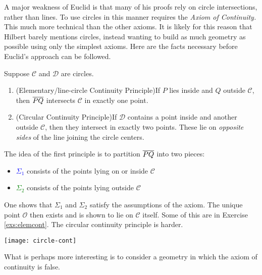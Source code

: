 A major weakness of Euclid is that many of his proofs rely on circle intersections, rather than lines. To use circles in this manner requires the \emph{Axiom of Continuity.} This much more technical than the other axioms. It is likely for this reason that Hilbert barely mentions circles, instead wanting to build as much geometry as possible using only the simplest axioms.\smallbreak
Here are the facts necessary before Euclid's approach can be followed.

\begin{thm}{}{}
	Suppose $\mathcal C$ and $\mathcal D$ are circles.\vspace{-5pt}
	\begin{enumerate}\itemsep0pt
	  \item (Elementary/line-circle Continuity Principle)\quad If $P$ lies inside and $Q$ outside $\mathcal C$, then $\overline{PQ}$ intersects $\mathcal C$ in exactly one point.
	  \item (Circular Continuity Principle)\quad If $\mathcal D$ contains a point inside and another outside $\mathcal C$, then they intersect in exactly two points. These lie on \emph{opposite sides} of the line joining the circle centers.
	\end{enumerate}
\end{thm}


\begin{minipage}[t]{0.73\linewidth}\vspace{0pt}
	The idea of the first principle is to partition $\overline{PQ}$ into two pieces:
	\begin{itemize}\itemsep0pt
	  \item[]\textcolor{blue}{$\Sigma_1$} consists of the points lying on or inside $\mathcal C$
	  \item[]\textcolor{Green}{$\Sigma_2$} consists of the points lying outside $\mathcal C$
	\end{itemize}
	One shows that $\Sigma_1$ and $\Sigma_2$ satisfy the assumptions of the axiom. The unique point $\mathcal O$ then exists and is shown to lie on $\mathcal C$ itself. Some of this are in Exercise \ref{exs:elemcont}. The circular continuity principle is harder.
\end{minipage}
\hfill
\begin{minipage}[t]{0.25\linewidth}\vspace{0pt}
	\flushright
	\texttt{[image: circle-cont]}
\end{minipage}
\medbreak

What is perhaps more interesting is to consider a geometry in which the axiom of continuity is false.

